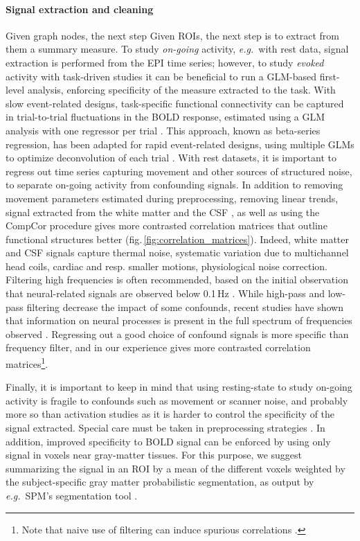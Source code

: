 \documentclass[5p]{elsarticle}
\begin{document}
\paragraph{Signal extraction and cleaning}
Given graph nodes, the next step 
Given ROIs, the next step is to extract from them a summary measure. To
study \emph{on-going} activity, \emph{e.g.}\ with rest data, signal
extraction is performed from the EPI time series; however, to study
\emph{evoked} activity with task-driven studies it can be beneficial to
run a GLM-based first-level analysis, enforcing specificity of the measure
extracted to the task. With slow event-related designs, task-specific
functional connectivity can be captured in trial-to-trial fluctuations in
the BOLD response, estimated using a GLM analysis with one regressor per
trial \cite{grillon2012,rissman2004}. This approach, known as beta-series
regression, has been adapted for rapid event-related designs, using
multiple GLMs to optimize deconvolution of each trial \cite{mumford2012}.
With rest datasets, it is important to regress out time series capturing
movement and other sources of structured noise, to separate on-going
activity from confounding signals. In addition to removing movement
parameters estimated during preprocessing, removing linear trends, signal
extracted from the white matter and the CSF \cite{chang2009}, as well as
using the CompCor \cite{behzadi2007} procedure gives more contrasted
correlation matrices that outline functional structures better
(fig.\,\ref{fig:correlation_matrices}). 
Indeed, white matter and CSF signals capture thermal noise, 
systematic variation due to multichannel head coils, cardiac and resp.
smaller motions, physiological noise correction.
Filtering high frequencies is
often recommended, based on the initial observation that neural-related
signals are observed below 0.1\,Hz \cite{cordes2001,biswal1995}. While
high-pass and low-pass filtering decrease the impact of some confounds,
recent studies have shown that information on neural processes is present
in the full spectrum of frequencies observed
\cite{smith2012,vanoort2012}. Regressing out a good choice of confound
signals is more specific than frequency filter, and in our experience
gives more contrasted correlation matrices\footnote{Note that naive use
of filtering can induce spurious correlations \cite{davey2012}.}.

Finally, it is important to keep in mind that using resting-state to
study on-going activity is fragile to confounds such as movement
\cite{vandijk2012,power2011} or scanner noise, and probably more so than
activation studies as it is harder to control the specificity of the
signal extracted. Special care must be taken in preprocessing strategies
\cite{vandijk2010,satterthwaite2012}.
%
In addition, improved specificity to BOLD signal can be enforced by
using only signal in voxels near gray-matter tissues. For this purpose,
we suggest summarizing the signal in an ROI by a mean of the different voxels
weighted by the subject-specific gray matter probabilistic segmentation,
as output by \emph{e.g.}\ SPM's segmentation tool \cite{ashburner2005}.
\end{document}
